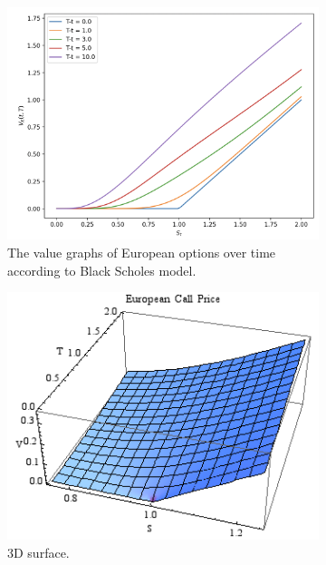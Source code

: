 \documentclass{article}
\begin{document}
    \begin{figure}[H]
      \centering
      \begin{subfigure}[b]{0.48\textwidth}
      \centering
        \includegraphics[width=\textwidth]{img/value_graph_over_time.png}
        \caption{The value graphs of European options over time according to Black Scholes model. }
        \label{fig:value_graph_over_time}
      \end{subfigure}
      \hfill 
      \begin{subfigure}[b]{0.48\textwidth}
      \centering
        \includegraphics[width=\textwidth]{img/option_surface.png}
        \caption{3D surface. }
        \label{fig:option_surface}
      \end{subfigure}
      \caption{}
      \label{fig:option_pricing_graphs}
    \end{figure}
    
\end{document}

